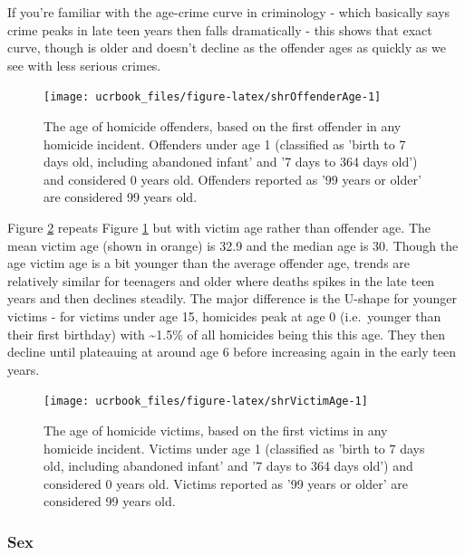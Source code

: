 \documentclass[
  12pt,
  openany]{book}
\begin{document}
If you're familiar with the age-crime curve in criminology - which basically says crime peaks in late teen years then falls dramatically - this shows that exact curve, though is older and doesn't decline as the offender ages as quickly as we see with less serious crimes.

\begin{figure}

{\centering \texttt{[image: ucrbook\_files/figure-latex/shrOffenderAge-1]} 

}

\caption{The age of homicide offenders, based on the first offender in any homicide incident. Offenders under age 1 (classified as 'birth to 7 days old, including abandoned infant' and '7 days to 364 days old') and considered 0 years old. Offenders reported as '99 years or older' are considered 99 years old.}\label{fig:shrOffenderAge}
\end{figure}

Figure \ref{fig:shrVictimAge} repeats Figure \ref{fig:shrOffenderAge} but with victim age rather than offender age. The mean victim age (shown in orange) is 32.9 and the median age is 30. Though the age victim age is a bit younger than the average offender age, trends are relatively similar for teenagers and older where deaths spikes in the late teen years and then declines steadily. The major difference is the U-shape for younger victims - for victims under age 15, homicides peak at age 0 (i.e.~younger than their first birthday) with \textasciitilde1.5\% of all homicides being this this age. They then decline until plateauing at around age 6 before increasing again in the early teen years.

\begin{figure}

{\centering \texttt{[image: ucrbook\_files/figure-latex/shrVictimAge-1]} 

}

\caption{The age of homicide victims, based on the first victims in any homicide incident. Victims under age 1 (classified as 'birth to 7 days old, including abandoned infant' and '7 days to 364 days old') and considered 0 years old. Victims reported as '99 years or older' are considered 99 years old.}\label{fig:shrVictimAge}
\end{figure}

\hypertarget{sex}{%
\subsubsection{Sex}\label{sex}}
\end{document}

